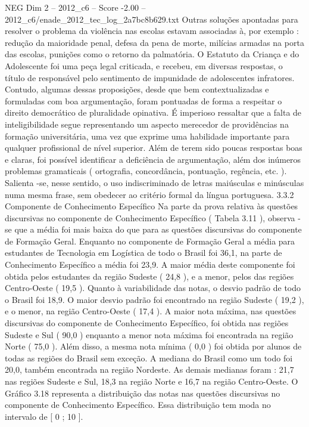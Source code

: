 \begin{textsample}{NEG Dim 2 – 2012\_c6 – Score -2.00 – 2012\_c6/enade\_2012\_tec\_log\_2a7bc8b629.txt}
Outras soluções apontadas para resolver o problema da violência nas escolas estavam associadas à, por exemplo : redução da maioridade penal, defesa da pena de morte, milícias armadas na porta das escolas, punições como o retorno da palmatória.
O Estatuto da Criança e do Adolescente foi uma peça legal criticada, e recebeu, em diversas respostas, o título de responsável pelo sentimento de impunidade de adolescentes infratores.
Contudo, algumas dessas proposições, desde que bem contextualizadas e formuladas com boa argumentação, foram pontuadas de forma a respeitar o direito democrático de pluralidade opinativa.
É imperioso ressaltar que a falta de inteligibilidade segue representando um aspecto merecedor de providências na formação universitária, uma vez que exprime uma habilidade importante para qualquer profissional de nível superior.
Além de terem sido poucas respostas boas e claras, foi possível identificar a deficiência de argumentação, além dos inúmeros problemas gramaticais ( ortografia, concordância, pontuação, regência, etc. ).
Salienta -se, nesse sentido, o uso indiscriminado de letras maiúsculas e minúsculas numa mesma frase, sem obedecer ao critério formal da língua portuguesa. 3.3.2 Componente de Conhecimento Específico Na parte da prova relativa às questões discursivas no componente de Conhecimento Específico ( Tabela 3.11 ), observa -se que a média foi mais baixa do que para as questões discursivas do componente de Formação Geral.
Enquanto no componente de Formação Geral a média para estudantes de Tecnologia em Logística de todo o Brasil foi 36,1, na parte de Conhecimento Específico a média foi 23,9.
A maior média deste componente foi obtida pelos estudantes da região Sudeste ( 24,8 ), e a menor, pelos das regiões Centro-Oeste ( 19,5 ).
Quanto à variabilidade das notas, o desvio padrão de todo o Brasil foi 18,9.
O maior desvio padrão foi encontrado na região Sudeste ( 19,2 ), e o menor, na região Centro-Oeste ( 17,4 ).
A maior nota máxima, nas questões discursivas do componente de Conhecimento Específico, foi obtida nas regiões Sudeste e Sul ( 90,0 ) enquanto a menor nota máxima foi encontrada na região Norte ( 75,0 ).
Além disso, a mesma nota mínima ( 0,0 ) foi obtida por alunos de todas as regiões do Brasil sem exceção.
A mediana do Brasil como um todo foi 20,0, também encontrada na região Nordeste.
As demais medianas foram : 21,7 nas regiões Sudeste e Sul, 18,3 na região Norte e 16,7 na região Centro-Oeste.
O Gráfico 3.18 representa a distribuição das notas nas questões discursivas no componente de Conhecimento Específico.
Essa distribuição tem moda no intervalo de [ 0 ; 10 ].

\end{textsample}
